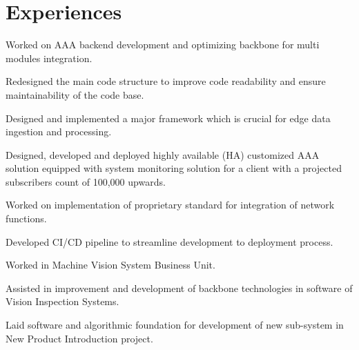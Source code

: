 \documentclass[letterpaper]{deedy-resume} %
\begin{document}
\hfill
%
%
\begin{minipage}[t]{0.66\textwidth} %


\section{Experiences}


\vspace{\topsep} %
\begin{tightitemize}
\item Worked on AAA backend development and optimizing backbone for multi modules integration.
\item Redesigned the main code structure to improve code readability and ensure maintainability of the code base.
\item Designed and implemented a major framework which is crucial for edge data ingestion and processing.
\item Designed, developed and deployed highly available (HA) customized AAA solution equipped with system monitoring solution for a client with a projected subscribers count of 100,000 upwards.
\item Worked on implementation of proprietary standard for integration of network functions.
\item Developed CI/CD pipeline to streamline development to deployment process.
\end{tightitemize}

\sectionspace %


\begin{tightitemize}
\item Worked in Machine Vision System Business Unit.
\item Assisted in improvement and development of backbone technologies in software of Vision Inspection Systems.
\item Laid software and algorithmic foundation for development of new sub-system in New Product Introduction project.
\end{tightitemize}


\end{minipage}
\end{document}
